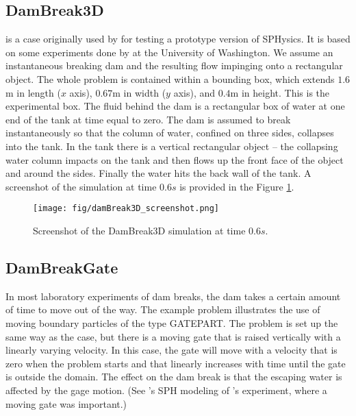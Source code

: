 \subsection{DamBreak3D}

 is a case originally used by
\cite{gomez-gesteira_using_2004}
for testing a prototype version of SPHysics. It is based on some
experiments done by \cite{arnason_interactions_2005} at the University of Washington.
We assume an instantaneous breaking dam and the resulting flow impinging
onto a rectangular object. The whole problem is contained within a
bounding box, which extends $1.6$m in length ($x$ axis), $0.67$m in
width ($y$ axis), and $0.4$m in height. This is the experimental box.
The fluid behind the dam is a rectangular box of water at one end of the
tank at time equal to zero. The dam is assumed to break instantaneously
so that the column of water, confined on three sides, collapses into the
tank. In the tank there is a vertical rectangular object -- the
collapsing water column impacts on the tank and then flows up the front
face of the object and around the sides. Finally the water hits the back
wall of the tank. A screenshot of the simulation at time $0.6s$ is provided
in the Figure \ref{fig:DamBreak3D}.

\begin{figure}[h]
  \begin{center}
    \texttt{[image: fig/damBreak3D\_screenshot.png]}
    \caption{Screenshot of the DamBreak3D simulation at time $0.6s$.}\label{fig:DamBreak3D}   
  \end{center}
\end{figure}

\subsection{DamBreakGate}

In most laboratory experiments of dam breaks, the dam takes a certain
amount of time to move out of the way. The example problem
 illustrates the use of moving boundary particles of
the type GATEPART. The problem is set up the same way as the
 case, but there is a moving gate that is raised
vertically with a linearly varying velocity. In this case, the gate will
move with a velocity that is zero when the problem starts and that
linearly increases with time until the gate is outside the domain. The
effect on the dam break is that the escaping water is affected by the
gage motion. (See \cite{crespo_modeling_2008}'s SPH modeling of
\cite{janosi_turbulent_2004}'s experiment, where a moving gate was important.)

